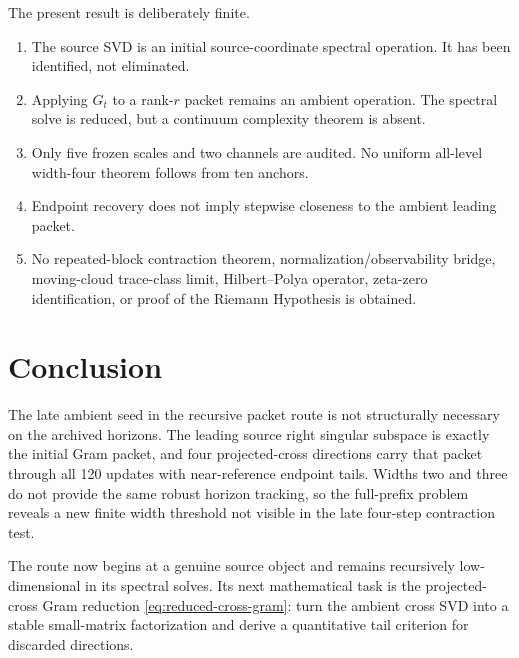 \documentclass[11pt]{article}
\theoremstyle{definition}
\theoremstyle{remark}
\begin{document}
The present result is deliberately finite.
\begin{enumerate}[leftmargin=2em]
\item The source SVD is an initial source-coordinate spectral operation.  It
has been identified, not eliminated.
\item Applying $G_t$ to a rank-$r$ packet remains an ambient operation.  The
spectral solve is reduced, but a continuum complexity theorem is absent.
\item Only five frozen scales and two channels are audited.  No uniform
all-level width-four theorem follows from ten anchors.
\item Endpoint recovery does not imply stepwise closeness to the ambient
leading packet.
\item No repeated-block contraction theorem, normalization/observability
bridge, moving-cloud trace-class limit, Hilbert--Polya operator, zeta-zero
identification, or proof of the Riemann Hypothesis is obtained.
\end{enumerate}

\section{Conclusion}

The late ambient seed in the recursive packet route is not structurally
necessary on the archived horizons.  The leading source right singular
subspace is exactly the initial Gram packet, and four projected-cross
directions carry that packet through all 120 updates with near-reference
endpoint tails.  Widths two and three do not provide the same robust horizon
tracking, so the full-prefix problem reveals a new finite width threshold not
visible in the late four-step contraction test.

The route now begins at a genuine source object and remains recursively
low-dimensional in its spectral solves.  Its next mathematical task is the
projected-cross Gram reduction \eqref{eq:reduced-cross-gram}: turn the ambient
cross SVD into a stable small-matrix factorization and derive a quantitative
tail criterion for discarded directions.



\end{document}
